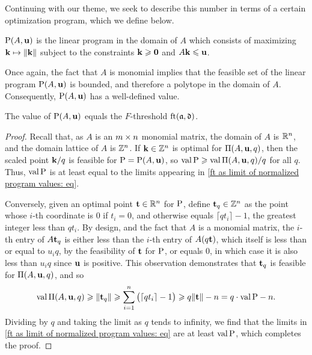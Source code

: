 \documentclass{amsart}
\begin{document}
Continuing with our theme, we seek to describe this number in terms of a certain optimization program, which we define below.

\begin{definition}
\label{LP: D}
 $\mathrm{P}(A, \mathbf{u})$ is the linear program in the domain of $A$ which consists of maximizing $\mathbf{k} \mapsto \| \mathbf{k} \|$ subject to the constraints $\mathbf{k} \geqslant \mathbf{0}$ and $A \mathbf{k} \leqslant \mathbf{u}$.
\end{definition}

Once again, the fact that $A$ is monomial implies that the feasible set of the linear program $\mathrm{P}(A,\mathbf{u})$ is bounded, and therefore a polytope in the domain of $A$.  Consequently, $\mathrm{P}(A,\mathbf{u})$ has a well-defined value.

\begin{proposition}
\label{ft as val LP: P}
The value of $\mathrm{P}(A, \mathbf{u})$ equals the $F$-threshold $\operatorname{ft}(\mathfrak{a}, \mathfrak{d})$.
\end{proposition}

\begin{proof}
  Recall that, as $A$ is an $m \times n$ monomial matrix, the domain of $A$ is $\mathbb{R}^n$, and the domain lattice of $A$ is $\mathbb{Z}^n$.  If $\mathbf{k} \in \mathbb{Z}^n$ is optimal for $\Pi(A,\mathbf{u},q)$, then the scaled point $\mathbf{k}/q$ is feasible for $\mathrm{P} = \mathrm{P}(A, \mathbf{u})$, so $\operatorname{val} \mathrm{P} \geqslant \operatorname{val} \Pi(A, \mathbf{u}, q)/q$ for all $q$.
   Thus, $\operatorname{val} \mathrm{P}$ is at least equal to the limits appearing in \eqref{ft as limit of normalized program values: eq}.

   Conversely, given an optimal point $\mathbf{t} \in \mathbb{R}^n$ for $\mathrm{P}$,
   define $\mathbf{t}_q \in \mathbb{Z}^n$ as the point whose $i$-th coordinate is $0$ if $t_i=0$, and otherwise equals $\lceil q t_i \rceil - 1$, the greatest integer less than $q t_i$.
   By design, and the fact that $A$ is a monomial matrix, the $i$-th entry of $A \mathbf{t}_q$ is either less than the $i$-th entry of $A (q \mathbf{t})$, which itself is less than or equal to $u_iq$, by the feasibility of $\mathbf{t}$ for $\mathrm{P}$, or equals $0$,  in which case it is also less than $u_i q$ since $\mathbf{u}$ is positive. This observation demonstrates that $\mathbf{t}_q$ is feasible for $\Pi(A, \mathbf{u}, q)$, and so
   \[\operatorname{val} \Pi(A, \mathbf{u}, q) \geqslant \| \mathbf{t}_q \| \geqslant \sum_{i=1}^n \big(\lceil q t_i \rceil - 1\big) \geqslant q \| \mathbf{t} \| -n = q \cdot \operatorname{val} \mathrm{P} - n.\]
   Dividing by $q$ and taking the limit as $q$ tends to infinity, we find that the limits in \eqref{ft as limit of normalized program values: eq} are at least $\operatorname{val} \mathrm{P}$, which completes the proof.
\end{proof}
\end{document}
